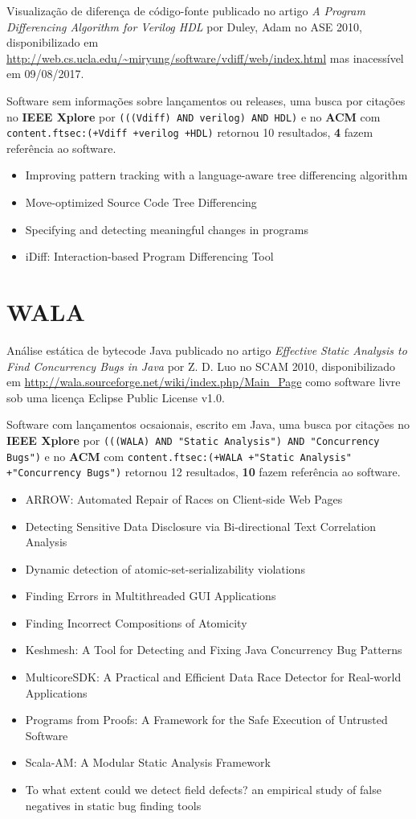 Visualização de diferença de código-fonte
publicado no artigo {\it A Program Differencing Algorithm for Verilog HDL}
por Duley, Adam
no ASE 2010,
disponibilizado em \url{http://web.cs.ucla.edu/~miryung/software/vdiff/web/index.html}
mas inacessível em 09/08/2017.

Software sem informações sobre lançamentos ou releases,
uma busca por citações no {\bf IEEE Xplore} por
\texttt{(((Vdiff) AND verilog) AND HDL)}
e no {\bf ACM} com
\texttt{content.ftsec:(+Vdiff +verilog +HDL)}
retornou
10 resultados,
{\bf 4} fazem referência ao software.

\begin{itemize}
\item Improving pattern tracking with a language-aware tree differencing algorithm
\item Move-optimized Source Code Tree Differencing
\item Specifying and detecting meaningful changes in programs
\item iDiff: Interaction-based Program Differencing Tool
\end{itemize}


\section{WALA}

Análise estática de bytecode Java
publicado no artigo {\it Effective Static Analysis to Find Concurrency Bugs in Java}
por Z. D. Luo
no SCAM 2010,
disponibilizado em \url{http://wala.sourceforge.net/wiki/index.php/Main_Page}
como software livre
sob uma licença Eclipse Public License v1.0.

Software com lançamentos ocsaionais,
escrito em Java,
uma busca por citações no {\bf IEEE Xplore} por
\texttt{(((WALA) AND "Static Analysis") AND "Concurrency Bugs")}
e no {\bf ACM} com
\texttt{content.ftsec:(+WALA +"Static Analysis" +"Concurrency Bugs")}
retornou
12 resultados,
{\bf 10} fazem referência ao software.

\begin{itemize}
\item ARROW: Automated Repair of Races on Client-side Web Pages
\item Detecting Sensitive Data Disclosure via Bi-directional Text Correlation Analysis
\item Dynamic detection of atomic-set-serializability violations
\item Finding Errors in Multithreaded GUI Applications
\item Finding Incorrect Compositions of Atomicity
\item Keshmesh: A Tool for Detecting and Fixing Java Concurrency Bug Patterns
\item MulticoreSDK: A Practical and Efficient Data Race Detector for Real-world Applications
\item Programs from Proofs: A Framework for the Safe Execution of Untrusted Software
\item Scala-AM: A Modular Static Analysis Framework
\item To what extent could we detect field defects? an empirical study of false negatives in static bug finding tools
\end{itemize}



